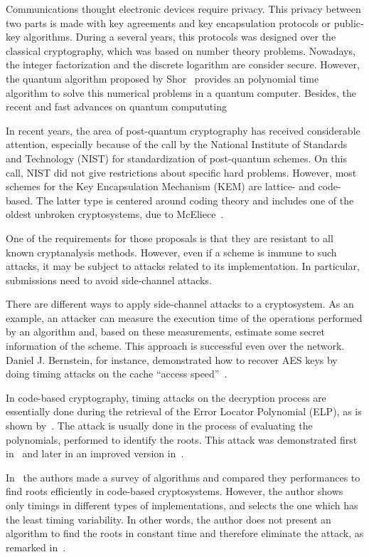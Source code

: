 Communications thought electronic devices require privacy. This privacy between two parts is made with key agreements and key encapsulation protocols or public-key algorithms. During a several years, this protocols was designed over the classical cryptography, which was based on number theory problems. Nowadays, the integer factorization and the discrete logarithm are consider secure. However, the quantum algorithm proposed by Shor~\cite{shor1999polynomial} provides an polynomial time algorithm to solve this numerical problems in a quantum computer. Besides, the recent and fast advances on quantum compututing 


In recent years, the area of post-quantum cryptography has received considerable attention, especially because of the call by the National Institute of Standards and Technology (NIST) for  standardization of post-quantum schemes. On this call, NIST did not give restrictions about specific hard problems. However, most schemes for the Key Encapsulation Mechanism (KEM) are lattice- and code-based. The latter type is centered around coding theory and includes one of the oldest unbroken cryptosystems, due to McEliece~\cite{mceliece1978public}.

One of the requirements for those proposals is that they are resistant to all known cryptanalysis methods. However, even if a scheme is immune to such attacks, it may be subject to attacks related to its implementation. In particular, submissions need to avoid side-channel attacks.

There are different ways to apply side-channel attacks to a cryptosystem. As an example, an attacker can measure the execution time of the operations performed by an algorithm and, based on these measurements, estimate some secret information of the scheme. This approach is successful even over the network. Daniel J. Bernstein, for instance, demonstrated how to recover AES keys by doing timing attacks on the cache ``access speed''~\cite{dan2005}.
 
In code-based cryptography, timing attacks on the decryption process are essentially done during the retrieval of the Error Locator Polynomial (ELP), as is shown by~\cite{shoufan2009timing}. The attack is usually done in the process of evaluating the polynomials, performed to identify the roots. This attack was demonstrated first in~\cite{shoufan2009timing} and later in an improved version in~\cite{bucerzan2017improved}.

In~\cite{strenzke2012fast} the authors made a survey of algorithms and compared they performances to find roots efficiently in code-based cryptosystems. However, the author shows only timings in different types of implementations, and selects the one which has the least timing variability. In other words, the author does not present an algorithm to find the roots in constant time and therefore eliminate the attack, as remarked in~\cite{strenzke2013efficiency}.

